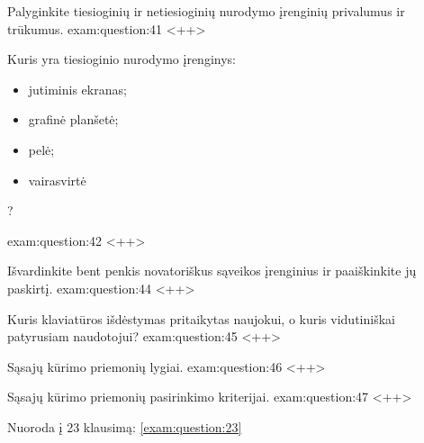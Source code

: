 \begin{question}{%
  Palyginkite tiesioginių ir netiesioginių nurodymo įrenginių privalumus
  ir trūkumus.
  }{exam:question:41}
  <++>
\end{question}

\begin{question}{%
  Kuris yra tiesioginio nurodymo įrenginys:
  \begin{itemize}
    \item jutiminis ekranas;
    \item grafinė planšetė;
    \item pelė;
    \item vairasvirtė
  \end{itemize}
  ?
  }{exam:question:42}
  <++>
\end{question}

\begin{question}{%
  Išvardinkite bent penkis novatoriškus sąveikos įrenginius ir
  paaiškinkite jų paskirtį.
  }{exam:question:44}
  <++>
\end{question}

\begin{question}{%
  Kuris klaviatūros išdėstymas pritaikytas naujokui, o kuris vidutiniškai
  patyrusiam naudotojui?
  }{exam:question:45}
  <++>
\end{question}

\begin{question}{%
  Sąsajų kūrimo priemonių lygiai.
  }{exam:question:46}
  <++>
\end{question}

\begin{question}{%
  Sąsajų kūrimo priemonių pasirinkimo kriterijai.
  }{exam:question:47}
  <++>
\end{question}

Nuoroda į 23 klausimą: \ref{exam:question:23}
